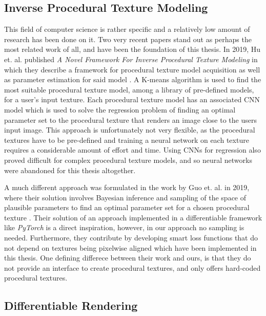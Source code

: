 \subsection{Inverse Procedural Texture Modeling}

This field of computer science is rather specific and a relatively low amount of research has been done on it. Two very recent papers stand out as perhaps the most related work of all, and have been the foundation of this thesis. In 2019, Hu et. al. published \textit{A Novel Framework For Inverse Procedural Texture Modeling} in which they describe a framework for procedural texture model acquisition as well as parameter estimation for said model \cite{hu_2019_a}. A K-means algorithm is used to find the most suitable procedural texture model, among a library of pre-defined models, for a user's input texture. Each procedural texture model has an associated CNN model which is used to solve the regression problem of finding an optimal parameter set to the procedural texture that renders an image close to the users input image. This approach is unfortunately not very flexible, as the procedural textures have to be pre-defined and training a neural network on each texture requires a considerable amount of effort and time. Using CNNs for regression also proved difficult for complex procedural texture models, and so neural networks were abandoned for this thesis altogether. 

A much different approach was formulated in the work by Guo et. al. in 2019, where their solution involves Bayesian inference and sampling of the space of plausible parameters to find an optimal parameter set for a chosen procedural texture \cite{guo_2019_a}. Their solution of an approach implemented in a differentiable framework like \textit{PyTorch} is a direct inspiration, however, in our approach no sampling is needed. Furthermore, they contribute by developing smart loss functions that do not depend on textures being pixelwise aligned which have been implemented in this thesis. One defining differece between their work and ours, is that they do not provide an interface to create procedural textures, and only offers hard-coded procedural textures.

\subsection{Differentiable Rendering}

